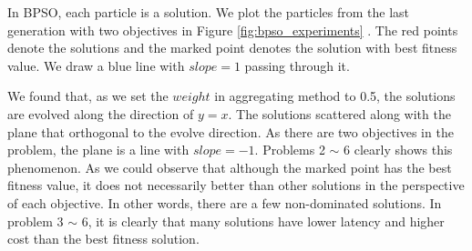 In BPSO, each particle is a solution. We plot the particles from the last
generation with two objectives in Figure \ref{fig:bpso_experiments} . The red points denote the solutions and the marked point denotes the solution with best fitness value. We draw a blue line with $slope = 1 $ passing through it.

We found that, as we set the $weight$ in aggregating method to 0.5, the solutions are evolved
along the direction of $y = x$. 
The solutions scattered along with the plane that orthogonal to the evolve direction. As there are two objectives in the problem, the plane is a line with $slope = -1$. Problems 2 $\sim$ 6 clearly shows this phenomenon. As we could observe that although the marked point has the best
fitness value, it does not necessarily better than other solutions in the perspective of each objective.
In other words, there are a few non-dominated solutions.
In problem 3 $\sim$ 6, it is clearly that many solutions have lower latency and higher cost than the best fitness solution. 

